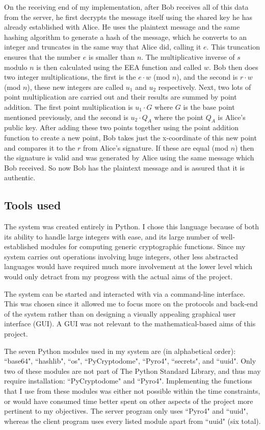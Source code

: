 \documentclass[12pt,a4paper]{article}
\begin{document}
On the receiving end of my implementation, after Bob receives all of this data from the server, 
he first decrypts the message itself using the shared key he has already established with Alice. 
He uses the plaintext message and the same hashing algorithm to generate a hash of the message, 
which he converts to an integer and truncates in the same way that Alice did, calling it $e$. 
This truncation ensures that the number $e$ is smaller than $n$. 
The multiplicative inverse of $s$ modulo $n$ is then calculated using the EEA function and called $w$. 
Bob then does two integer multiplications, the first is the $e \cdot w$ (mod $n$), 
and the second is $r \cdot w$ (mod $n$), these new integers are called $u_1$ and $u_2$ respectively. 
Next, two lots of point multiplication are carried out and their results are summed by point addition. 
The first point multiplication is $u_1 \cdot G$ where $G$ is the base point mentioned previously, 
and the second is $u_2 \cdot Q_A$ where the point $Q_A$ is Alice's public key. 
After adding these two points together using the point addition function to create a new point, 
Bob takes just the x-coordinate of this new point and compares it to the $r$ from Alice's signature. 
If these are equal (mod $n$) then the signature is valid and was generated by Alice using the same message which Bob received. 
So now Bob has the plaintext message and is assured that it is authentic. 


\subsection{Tools used} \noindent \label{Tools}
The system was created entirely in Python. 
I chose this language because of both its ability to handle large integers with ease, 
and its large number of well-established modules for computing generic cryptographic functions. 
Since my system carries out operations involving huge integers, other less abstracted languages would 
have required much more involvement at the lower level which would only detract from my progress with the actual aims of the project. 

The system can be started and interacted with via a command-line interface. 
This was chosen since it allowed me to focus 
more on the protocols and back-end of the system rather than on designing a visually appealing graphical user interface (GUI). 
A GUI was not relevant to the mathematical-based aims of this project. 

The seven Python modules used in my system are (in alphabetical order): 
``base64", ``hashlib", ``os", ``PyCryptodome", ``Pyro4", ``secrets", and ``uuid". 
Only two of these modules are not part of The Python Standard Library, and thus may require installation: ``PyCryptodome" and ``Pyro4". 
Implementing the functions that I use from these modules was either not possible within the time constraints, 
or would have consumed time better spent on other aspects of the project more pertinent to my objectives. 
The server program only uses ``Pyro4" and ``uuid", whereas the client program uses every listed module apart from ``uuid" (six total). 
\end{document}
